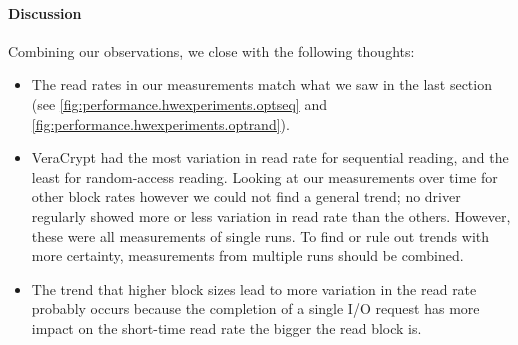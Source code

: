 \paragraph{Discussion}
Combining our observations, we close with the following thoughts:
\begin{itemize}[beginpenalty=10000]
	\item The read rates in our measurements match what we saw in the last section (see \autoref{fig:performance.hwexperiments.optseq} and \autoref{fig:performance.hwexperiments.optrand}).
	\item VeraCrypt had the most variation in read rate for sequential reading, and the least for random-access reading. Looking at our measurements over time for other block rates however we could not find a general trend; no driver regularly showed more or less variation in read rate than the others. However, these were all measurements of single runs. To find or rule out trends with more certainty, measurements from multiple runs should be combined.
	\item The trend that higher block sizes lead to more variation in the read rate probably occurs because the completion of a single I/O request has more impact on the short-time read rate the bigger the read block is.
\end{itemize}